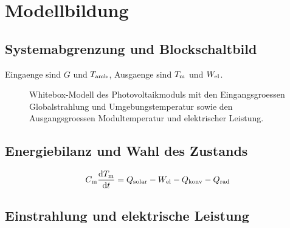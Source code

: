 \section{Modellbildung}
\label{sec:modellbildung}


\subsection{Systemabgrenzung und Blockschaltbild}
\label{sec:abgrenzung}


Eingaenge sind $G$ und $T_\mathrm{amb}$, Ausgaenge sind $T_\mathrm{m}$ und $W_\mathrm{el}$.

\begin{figure}[htbp]
  \centering
  \caption{Whitebox-Modell des Photovoltaikmoduls mit den Eingangsgroessen
           Globalstrahlung und Umgebungstemperatur sowie den Ausgangsgroessen
           Modultemperatur und elektrischer Leistung.}
  \label{fig:blockschaltbild}
\end{figure}

\subsection{Energiebilanz und Wahl des Zustands}
\label{sec:bilanz}


\begin{equation}
  C_\mathrm{m} \frac{\mathrm{d}T_\mathrm{m}}{\mathrm{d}t}
    = Q_\mathrm{solar} - W_\mathrm{el} - Q_\mathrm{konv} - Q_\mathrm{rad}
  \label{eq:bilanz}
\end{equation}

\subsection{Einstrahlung und elektrische Leistung}
\label{sec:elektrisch}

